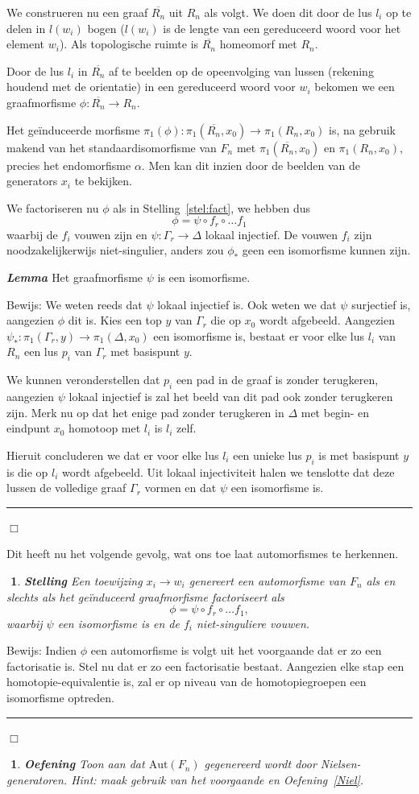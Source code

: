 \documentclass[12pt]{book}
\newcommand{\bew}{{\sc Bewijs: }}
\newcommand{\B}{\rule{1mm}{0mm} \hfill $\Box$ }
\newtheorem{stelh}{$\!\!$}[section]
\newenvironment{stel}{\begin{stelh}{\em {\bf Stelling }}}{\end{stelh}}
\newenvironment{lem}{\begin{lemh}{\em {\bf Lemma }}}{\end{lemh}}
\newtheorem{eoef}{$\!\!$}[chapter]
\newenvironment{oef}{\begin{eoef} {\bf Oefening}}{\end{eoef}}
\begin{document}
We construeren nu een graaf $\overline{R_n}$ uit $R_n$ als volgt. We doen dit door de lus $l_i$ op te delen in $l(w_i)$ bogen ($l(w_i)$ is de lengte van een gereduceerd woord voor het element $w_i$). Als topologische ruimte is $\overline{R_n}$ homeomorf met $R_n$.

Door de lus $l_i$ in $\overline{R_n}$ af te beelden op de opeenvolging van lussen (rekening houdend met de orientatie) in een gereduceerd woord voor $w_i$ bekomen we een graafmorfisme $\phi : \overline{R_n} \to R_n$.

Het ge\"induceerde morfisme $\pi_1(\phi)  \colon \pi_1(\overline{R_n},x_0) \to \pi_1(R_n,x_0)$ is, na gebruik makend van het standaardisomorfisme van $F_n$ met $\pi_1(\overline{R_n},x_0)$ en $\pi_1(R_n,x_0)$, precies het endomorfisme $\alpha$. Men kan dit inzien door de beelden van de generators $x_i$ te bekijken.

We factoriseren nu $\phi$ als in Stelling~\ref{stel:fact}, we hebben dus 
$$
\phi = \psi \circ f_r \circ \dots f_1
$$
waarbij de $f_i$ vouwen zijn en $\psi\colon \Gamma_r \to \Delta$ lokaal injectief. De vouwen $f_i$ zijn noodzakelijkerwijs niet-singulier, anders zou $\phi_*$ geen een isomorfisme kunnen zijn.

\begin{lem}
Het graafmorfisme $\psi$ is een isomorfisme.
\end{lem}
\bew
We weten reeds dat $\psi$ lokaal injectief is. Ook weten we dat $\psi$ surjectief is, aangezien $\phi$ dit is. Kies een top $y$ van $\Gamma_r$ die op $x_0$ wordt afgebeeld. Aangezien $\psi_*\colon \pi_1(\Gamma_r,y) \to \pi_1(\Delta,x_0)$ een isomorfisme is, bestaat er voor elke lus $l_i$ van $R_n$ een lus $p_i$ van $\Gamma_r$ met basispunt $y$.

We kunnen veronderstellen dat $p_i$ een pad in de graaf is zonder terugkeren, aangezien $\psi$ lokaal injectief is zal het beeld van dit pad ook zonder terugkeren zijn. Merk nu op dat het enige pad zonder terugkeren in $\Delta$ met begin- en eindpunt $x_0$ homotoop met $l_i$ is $l_i$ zelf.

Hieruit concluderen we dat er voor elke lus $l_i$ een unieke lus $p_i$ is met basispunt $y$ is die op $l_i$ wordt afgebeeld. Uit lokaal injectiviteit halen we tenslotte dat deze lussen de volledige graaf $\Gamma_r$ vormen en dat $\psi$ een isomorfisme is.
\B

Dit heeft nu het volgende gevolg, wat ons toe laat automorfismes te herkennen.

\begin{stel}
Een toewijzing $x_i \to w_i$ genereert een automorfisme van $F_n$ als en slechts als het ge\"induceerd graafmorfisme factoriseert als $$\phi = \psi \circ f_r \circ \dots f_1,$$ waarbij $\psi$ een isomorfisme is en de $f_i$ niet-singuliere vouwen.
\end{stel}
\bew
Indien $\phi$ een automorfisme is volgt uit het voorgaande dat er zo een factorisatie is. Stel nu dat er zo een factorisatie bestaat. Aangezien elke stap een homotopie-equivalentie is, zal er op niveau van de homotopiegroepen een isomorfisme optreden.
\B

\begin{oef}
Toon aan dat $\mathrm{Aut}(F_n)$ gegenereerd wordt door Nielsen-generatoren. Hint: maak gebruik van het voorgaande en Oefening~\ref{Niel}.
\end{oef}
\end{document}

